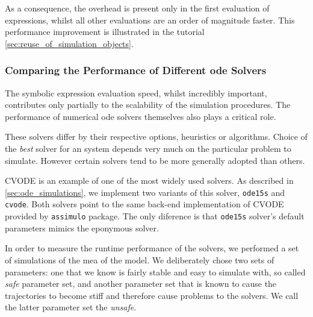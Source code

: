 As a consequence, the overhead is present only in the first evaluation of expressions, whilst all other evaluations are an order of magnitude faster.
This performance improvement is illustrated in the tutorial \autoref{sec:reuse_of_simulation_objects}.



\subsubsection{Comparing the Performance of Different \gls{ode} Solvers}
\label{sec:compare-performance-of-ode-solvers}

The symbolic expression evaluation speed, whilst incredibly important, contributes only partially to the scalability of the simulation procedures.
The performance of numerical \gls{ode} solvers themselves also plays a critical role.

These solvers differ by their respective options, heuristics or algorithms.
Choice of the \emph{best} solver for an  system depends very much on the particular problem to simulate.
However certain solvers tend to be more generally adopted than others\cite{andersson_workbench_2012}.

CVODE\cite{hindmarsh_sundials_2005} is an example of one of the most widely used solvers.
As described in \autoref{sec:ode_simulations}, we implement two variants of this solver, \verb#ode15s# and \verb#cvode#.
Both solvers point to the same back-end implementation of CVODE provided by \verb#assimulo# package\cite{andersson_christian_assimulo:_????}.
The only diference is that \verb#ode15s# solver's default parameters mimics the eponymous \mat{} solver.

In order to measure the runtime performance of the solvers, we performed a set of simulations of the \acrlong{mea} of the \pft{} model.
We deliberately chose two sets of parameters: one that we know is fairly stable and easy to simulate with, so called \emph{safe} parameter set,
and another parameter set that is known to cause the trajectories to become stiff and therefore cause problems to the solvers.
We call the latter parameter set the \emph{unsafe}.
 
